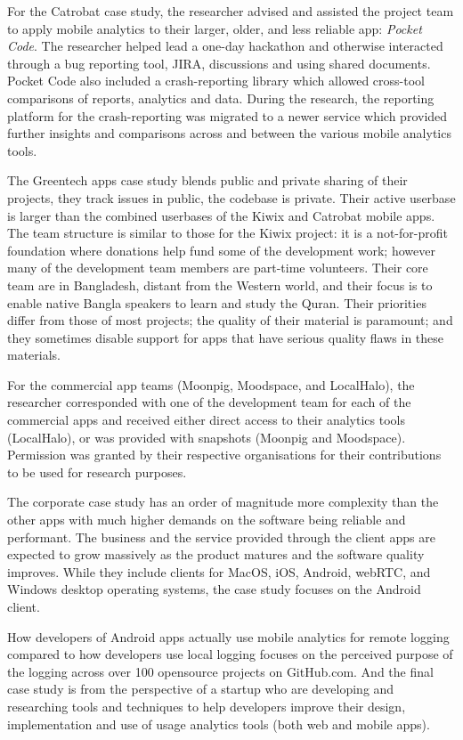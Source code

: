 For the Catrobat case study, the researcher advised and assisted the project team to apply mobile analytics to their larger, older, and less reliable app: \emph{Pocket Code}. The researcher helped lead a one-day hackathon and otherwise interacted through a bug reporting tool, JIRA, discussions and using shared documents. Pocket Code also included a crash-reporting library which allowed cross-tool comparisons of reports, analytics and data. During the research, the reporting platform for the crash-reporting was migrated to a newer service which provided further insights and comparisons across and between the various mobile analytics tools.

The Greentech apps case study blends public and private sharing of their projects, they track issues in public, the codebase is private. Their active userbase is larger than the combined userbases of the Kiwix and Catrobat mobile apps. The team structure is similar to those for the Kiwix project: it is a not-for-profit foundation where donations help fund some of the development work; however many of the development team members are part-time volunteers. Their core team are in Bangladesh, distant from the Western world, and their focus is to enable native Bangla speakers to learn and study the Quran. Their priorities differ from those of most projects; the quality of their material is paramount; and they sometimes disable support for apps that have serious quality flaws in these materials. 

For the commercial app teams (Moonpig, Moodspace, and LocalHalo), the researcher corresponded with one of the development team for each of the commercial apps and received either direct access to their analytics tools (LocalHalo), or was provided with snapshots (Moonpig and Moodspace). Permission was granted by their respective organisations for their contributions to be used for research purposes.

The corporate case study has an order of magnitude more complexity than the other apps with much higher demands on the software being reliable and performant. The business and the service provided through the client apps are expected to grow massively as the product matures and the software quality improves. While they include clients for MacOS, iOS, Android, webRTC, and Windows desktop operating systems, the case study focuses on the Android client.

How developers of Android apps actually use mobile analytics for remote logging compared to how developers use local logging focuses on the perceived purpose of the logging across over 100 opensource projects on GitHub.com. And the final case study is from the perspective of a startup who are developing and researching tools and techniques to help developers improve their design, implementation and use of usage analytics tools (both web and mobile apps). 


